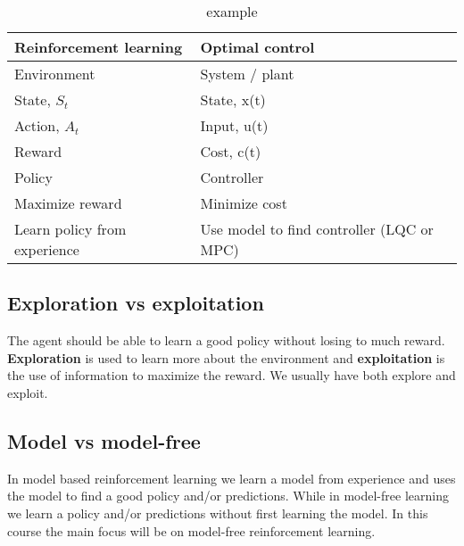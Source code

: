 \begin{table}[ht!]
\centering
\begin{tabular}{ll}
 \textbf{Reinforcement learning}&  \textbf{Optimal control}  \\ \hline
 Environment &  System / plant  \\
 State, $S_t$& State, x(t)  \\ 
 Action, $A_t$& Input, u(t)\\
Reward & Cost, c(t)\\
Policy & Controller \\
Maximize reward & Minimize cost\\
Learn policy from experience & Use model to find controller (LQC or MPC)\\ \hline
\end{tabular}
\caption{example}
\label{tab:tab1}
\end{table}

\subsection{Exploration vs exploitation}
The agent should be able to learn a good policy without losing to much reward. \textbf{Exploration} is used to learn more about the environment and \textbf{exploitation} is the use of information to maximize the reward. We usually have both explore and exploit.


\subsection{Model vs model-free}
In model based reinforcement learning we learn a model from experience and uses the model to find a good policy and/or predictions. While in model-free learning we learn a policy and/or predictions without first learning the model. In this course the main focus will be on model-free reinforcement learning.  







